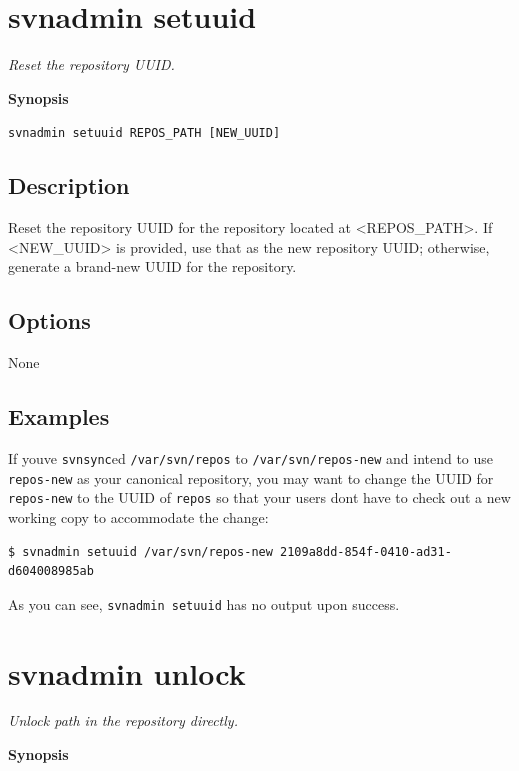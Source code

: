 \section{svnadmin setuuid}\label{svn.ref.svnadmin.c.setuuid}

\emph{Reset the repository UUID.}

\textbf{Synopsis}

\texttt{svnadmin\ setuuid\ REPOS\_PATH\ {[}NEW\_UUID{]}}

\subsection{Description}

Reset the repository UUID for the repository located at
\textless REPOS\_PATH\textgreater. If \textless NEW\_UUID\textgreater{}
is provided, use that as the new repository UUID; otherwise, generate a
brand-new UUID for the repository.

\subsection{Options}

None

\subsection{Examples}

If you\textquotesingle ve \texttt{svnsync}ed \texttt{/var/svn/repos} to
\texttt{/var/svn/repos-new} and intend to use \texttt{repos-new} as your
canonical repository, you may want to change the UUID for
\texttt{repos-new} to the UUID of \texttt{repos} so that your users
don\textquotesingle t have to check out a new working copy to
accommodate the change:

\begin{verbatim}
$ svnadmin setuuid /var/svn/repos-new 2109a8dd-854f-0410-ad31-d604008985ab
\end{verbatim}

As you can see, \texttt{svnadmin\ setuuid} has no output upon success.

\section{svnadmin unlock}\label{svn.ref.svnadmin.c.unlock}

\emph{Unlock path in the repository directly.}

\textbf{Synopsis}

